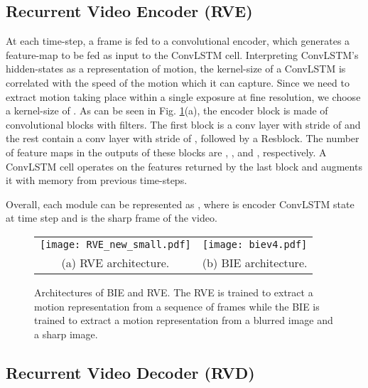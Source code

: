 \documentclass[10pt,twocolumn,letterpaper]{article}
\begin{document}
\subsection{Recurrent Video Encoder (RVE)}
\label{sec:rve}

At each time-step, a frame is fed to a convolutional encoder, which generates a feature-map to be fed as input to the ConvLSTM cell. Interpreting ConvLSTM's hidden-states as a representation of motion, the kernel-size of a ConvLSTM is correlated with the speed of the motion which it can capture. Since we need to extract motion taking place within a single exposure at fine resolution, we choose a kernel-size of . As can be seen in Fig. \ref{fig:BIEnRVE}(a), the encoder block is made of  convolutional blocks with  filters. The first block is a conv layer with stride of  and the rest contain a conv layer with stride of , followed by a Resblock. The number of feature maps in the outputs of these blocks are , ,  and , respectively. A ConvLSTM cell operates on the features returned by the last block and augments it with memory from previous time-steps.

Overall, each module can be represented as ,
where  is encoder ConvLSTM state at time step  and  is the  sharp frame of the video.

\begin{figure}
\begin{center}
 \begin{tabular}{cc}
   \texttt{[image: RVE\_new\_small.pdf]} &
      \texttt{[image: biev4.pdf]}\\

            (a) RVE architecture. & (b)  BIE architecture.
       \end{tabular}
\end{center}
   \caption{Architectures of BIE and RVE. The RVE is trained to extract a motion representation from a sequence of frames while the BIE is trained to extract a motion representation from a blurred image and a sharp image.}
\label{fig:BIEnRVE}
\end{figure}


\subsection{Recurrent Video Decoder (RVD)}
\label{sec:rvd}
\end{document}
